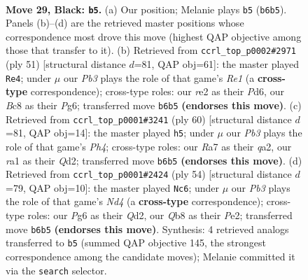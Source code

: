 \documentclass[11pt]{article}
\begin{document}
\clearpage

\begin{figure}[p]\centering
\begin{subfigure}{0.46\textwidth}\centering
\resizebox{\linewidth}{!}{%
\newchessgame
\chessboard[
  setfen={1qb5/r4pkp/1p3np1/6N1/Pp6/1P4P1/3NRPBP/R6K b - - 9 29},
  showmover=false,
  pgfstyle=straightmove, color=movearrow, markmove={b6-b5}
]}
\caption{}
\end{subfigure}\hfill
\begin{subfigure}{0.46\textwidth}\centering
\resizebox{\linewidth}{!}{%
\newchessgame
\chessboard[
  setfen={4r3/1pp2rkp/2np2p1/p2N4/2P2P2/5RP1/PP1R2KP/8 b - - 1 26},
  showmover=false,
  pgfstyle=straightmove, color=movearrow, markmove={e8-e4}
]}
\caption{}
\end{subfigure}
\\[4pt]
\begin{subfigure}{0.46\textwidth}\centering
\resizebox{\linewidth}{!}{%
\newchessgame
\chessboard[
  setfen={3r2k1/pp3p1p/4p1p1/1P6/3nR2P/3P2P1/qP1Q1PB1/6K1 w - - 0 31},
  showmover=false,
  pgfstyle=straightmove, color=movearrow, markmove={h4-h5}
]}
\caption{}
\end{subfigure}\hfill
\begin{subfigure}{0.46\textwidth}\centering
\resizebox{\linewidth}{!}{%
\newchessgame
\chessboard[
  setfen={1rbn1rk1/p3p2p/3p1p2/6p1/qP1N3R/6P1/3QPPBP/2R3K1 w - - 0 28},
  showmover=false,
  pgfstyle=straightmove, color=movearrow, markmove={d4-c6}
]}
\caption{}
\end{subfigure}
\caption{\textbf{Move 29, Black: \texttt{b5}.} (a) Our position; Melanie plays \texttt{b5} (\texttt{b6b5}). Panels (b)--(d) are the retrieved master positions whose correspondence most drove this move (highest QAP objective among those that transfer to it). (b) Retrieved from \texttt{ccrl\_top\_p0002\#2971} (ply 51) [structural distance $d$=81, QAP obj=61]: the master played \texttt{Re4}; under $\mu$ our \emph{Pb3} plays the role of that game's \emph{Re1} (a \textbf{cross-type} correspondence); cross-type roles: our \emph{r}e2 as their \emph{P}d6, our \emph{B}c8 as their \emph{P}g6; transferred move \texttt{b6b5} \textbf{(endorses this move)}. (c) Retrieved from \texttt{ccrl\_top\_p0001\#3241} (ply 60) [structural distance $d$=81, QAP obj=14]: the master played \texttt{h5}; under $\mu$ our \emph{Pb3} plays the role of that game's \emph{Ph4}; cross-type roles: our \emph{R}a7 as their \emph{q}a2, our \emph{r}a1 as their \emph{Q}d2; transferred move \texttt{b6b5} \textbf{(endorses this move)}. (d) Retrieved from \texttt{ccrl\_top\_p0001\#2424} (ply 54) [structural distance $d$=79, QAP obj=10]: the master played \texttt{Nc6}; under $\mu$ our \emph{Pb3} plays the role of that game's \emph{Nd4} (a \textbf{cross-type} correspondence); cross-type roles: our \emph{P}g6 as their \emph{Q}d2, our \emph{Q}b8 as their \emph{P}e2; transferred move \texttt{b6b5} \textbf{(endorses this move)}. Synthesis: 4 retrieved analogs transferred to \texttt{b5} (summed QAP objective 145, the strongest correspondence among the candidate moves); Melanie committed it via the \texttt{search} selector.}
\label{fig:thought-m57}
\end{figure}
\end{document}
